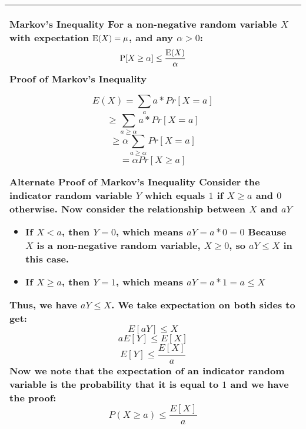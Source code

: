 {\tabulinesep=1mm
\begin{tabu}{|p{16cm} |}
\hline
\vspace{2 mm}
\textbf{Markov's Inequality } \newline
For a non-negative random variable $X$ with expectation $\text{E}(X) = \mu$, 
and any  $\alpha > 0$:
\[\text{P}[X \geq \alpha] \leq \frac{\text{E}(X)}{\alpha}\]
\vspace{2 mm}
\textbf{Proof of Markov's Inequality}\newline

\[E(X) = \sum_a a * Pr[X = a] \]
\[\geq \sum_{a \geq \alpha} a *  Pr[X = a] \]
\[\geq \alpha \sum_{a \geq \alpha} Pr[X = a] \]
\[= \alpha Pr[X \geq a]\]

\textbf{Alternate Proof of Markov's Inequality} \newline
Consider the indicator random variable $Y$ which equals $1$ if $X \geq a$ and $0$ otherwise. \newline
Now consider the relationship between $X$ and $aY$ \newline
\begin{itemize}
	\item If $X < a$, then $Y = 0$, which means $aY = a * 0 = 0$ \newline
	Because $X$ is a non-negative random variable, $X \geq 0$, so $aY \leq X$ in this case. 
	\item If $X \geq a$, then $Y = 1$, which means $aY = a * 1 = a \leq X$ \newline
\end{itemize}
Thus, we have $aY \leq X$. \newline
We take expectation on both sides to get: 
\[E[aY] \leq X\]
\[aE[Y] \leq E[X]\]
\[E[Y] \leq \frac{E[X]}{a} \]
Now we note that the expectation of an indicator random variable is the probability that it is equal to $1$ and we have the proof:
\[P(X \geq a) \leq \frac{E[X]}{a} \]
\vspace{2 mm}
\\
\hline
\end{tabu}
}

